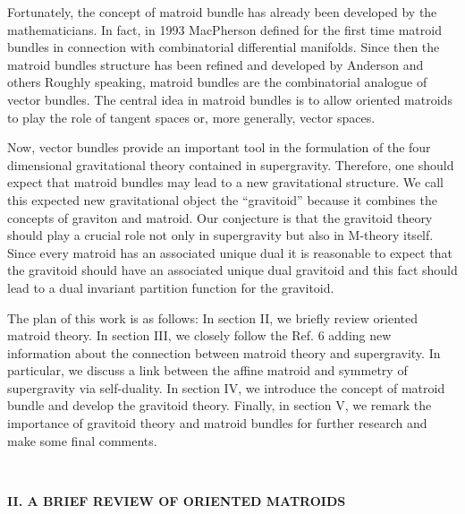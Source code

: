 \documentclass[a4paper,12pt]{article}
\begin{document}
Fortunately, the concept of matroid bundle has already been developed by the
mathematicians. In fact, in 1993 MacPherson\coordHE{} defined for the first
time matroid bundles in connection with combinatorial differential
manifolds. Since then the matroid bundles structure has been refined and
developed by Anderson\coordHE{} and others\coordHE{} Roughly speaking, matroid
bundles are the combinatorial analogue of vector bundles. The central idea
in matroid bundles is to allow oriented matroids\coordHE{} to play the role of
tangent spaces or, more generally, vector spaces.

Now, vector bundles provide an important tool in the formulation of the four
dimensional gravitational theory contained in \coordHE{} supergravity.
Therefore, one should expect that matroid bundles may lead to a new
gravitational structure. We call this expected new gravitational object the
``gravitoid'' because it combines the concepts of graviton and matroid. Our
conjecture is that the gravitoid theory should play a crucial role not only
in \coordHE{} supergravity but also in M-theory itself. Since every matroid has
an associated unique dual it is reasonable to expect that the gravitoid
should have an associated unique dual gravitoid and this fact should lead to
a dual invariant partition function for the gravitoid.

The plan of this work is as follows: In section II, we briefly review
oriented matroid theory. In section III, we closely follow the Ref. 6 adding
new information about the connection between matroid theory and \coordHE{}
supergravity. In particular, we discuss a link between the affine matroid \coordHE{} and \coordHE{}symmetry of \coordHE{} supergravity via self-duality. In
section IV, we introduce the concept of matroid bundle and develop the
gravitoid theory. Finally, in section V, we remark the importance of
gravitoid theory and matroid bundles for further research and make some
final comments.

\bigskip

\smallskip\ 

\noindent \textbf{II. A BRIEF REVIEW OF ORIENTED MATROIDS}

\bigskip
\end{document}
